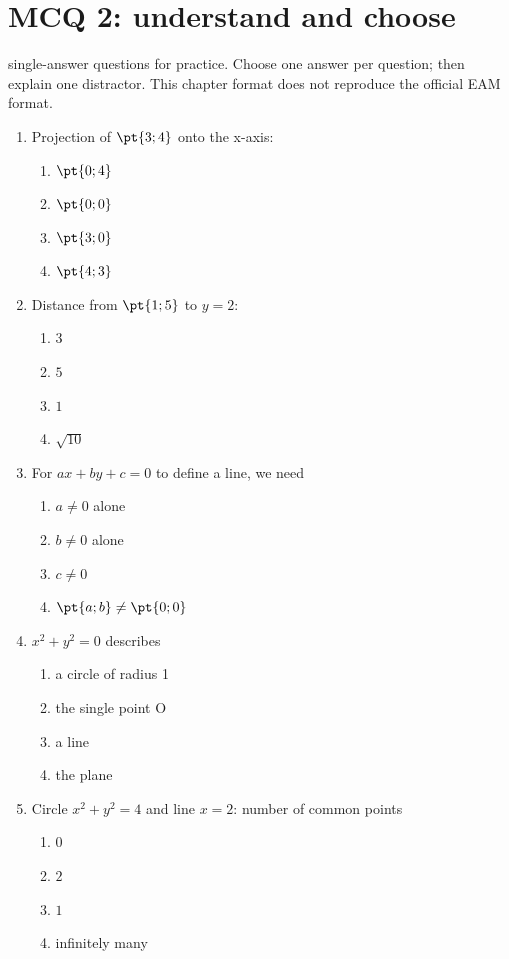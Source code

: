 \endgroup
\begingroup\small
{}\section*{MCQ 2: understand and choose}\label{C07-Q2}
 single-answer questions for practice. Choose one answer per question; then explain one distractor. This chapter format does not reproduce the official EAM format.
\begin{enumerate}
\item Projection of $\pt{3;4}$ onto the x-axis:
\begin{enumerate}[label=\Alph*.,itemsep=2pt]
\item $\pt{0;4}$
\item $\pt{0;0}$
\item $\pt{3;0}$
\item $\pt{4;3}$
\end{enumerate}
\item Distance from $\pt{1;5}$ to $y=2$:
\begin{enumerate}[label=\Alph*.,itemsep=2pt]
\item $3$
\item $5$
\item $1$
\item $\sqrt{10}$
\end{enumerate}
\item For $ax+by+c=0$ to define a line, we need
\begin{enumerate}[label=\Alph*.,itemsep=2pt]
\item $a\ne0$ alone
\item $b\ne0$ alone
\item $c\ne0$
\item $\pt{a;b}\ne\pt{0;0}$
\end{enumerate}
\item $x^2+y^2=0$ describes
\begin{enumerate}[label=\Alph*.,itemsep=2pt]
\item a circle of radius 1
\item the single point O
\item a line
\item the plane
\end{enumerate}
\item Circle $x^2+y^2=4$ and line $x=2$: number of common points
\begin{enumerate}[label=\Alph*.,itemsep=2pt]
\item $0$
\item $2$
\item $1$
\item infinitely many
\end{enumerate}
\end{enumerate}
